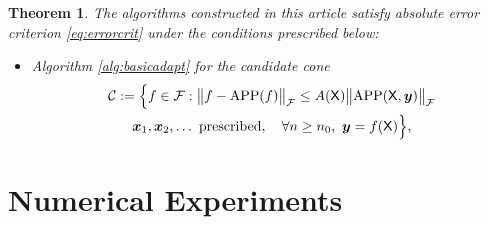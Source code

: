 \documentclass[]{mcom-l}
\theoremstyle{plain}
\newtheorem{theorem}{Theorem}
\theoremstyle{definition}
\DeclareMathOperator{\APP}{APP}
\newcommand{\mX}{\mathsf{X}}
\newcommand{\bx}{{\boldsymbol{x}}}
\newcommand{\by}{{\boldsymbol{y}}}
\newcommand{\calc}{{\mathcal{C}}}
\newcommand{\calf}{{\mathcal{F}}}
\newcommand{\bignorm}[2][{}]{\ensuremath{\bigl \lVert #2 \bigr \rVert}_{#1}}
\begin{document}
\begin{theorem}
	The algorithms constructed in this article satisfy absolute error criterion \eqref{eq:errorcrit} under the conditions prescribed below:
	\begin{itemize}
		\item Algorithm \ref{alg:basicadapt} for the candidate cone
		\begin{multline}
		\label{eq:finalconeOne}
		\calc := 
		\Bigl \{f \in \calf : \bignorm[\calf]{f - \APP(f)} \le A(\mX) \bignorm[\calf]{\APP(\mX,\by)} \\
		\bx_1, \bx_2, \ldots \text{ prescribed}, \quad \forall n \ge n_0,  \ \by = f(\mX) \Bigr \},
		\end{multline}
	\end{itemize}
\end{theorem}
\section{Numerical Experiments}




\end{document}
